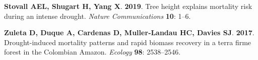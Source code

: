 \documentclass[
]{article}
\begin{document}
\leavevmode\hypertarget{ref-stovall_tree_2019}{}%
\textbf{\textnormal{Stovall AEL}, \textnormal{Shugart H},
\textnormal{Yang X}}. \textbf{2019}. Tree height explains mortality risk
during an intense drought. \emph{Nature Communications} \textbf{10}:
1--6.

\leavevmode\hypertarget{ref-zuleta_drought-induced_2017}{}%
\textbf{\textnormal{Zuleta D}, \textnormal{Duque A},
\textnormal{Cardenas D}, \textnormal{Muller‐Landau HC},
\textnormal{Davies SJ}}. \textbf{2017}. Drought-induced mortality
patterns and rapid biomass recovery in a terra firme forest in the
Colombian Amazon. \emph{Ecology} \textbf{98}: 2538--2546.
\end{document}
